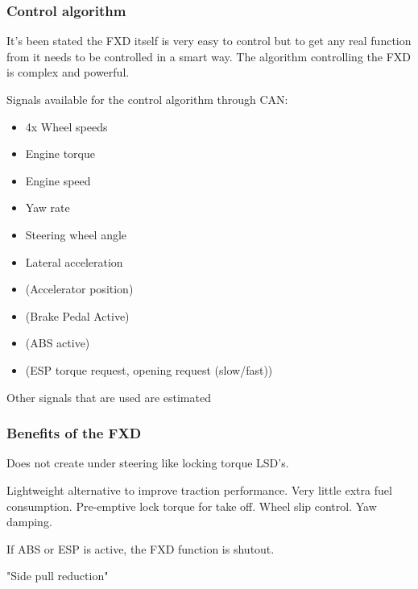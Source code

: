 \subsubsection{Control algorithm}
It's been stated the FXD itself is very easy to control but to get any real function from it needs to be controlled in a smart way. The algorithm controlling the FXD is complex and powerful.

Signals available for the control algorithm through CAN:
\begin{itemize}
	\item 4x Wheel speeds
	\item Engine torque
	\item Engine speed
	\item Yaw rate
	\item Steering wheel angle
	\item Lateral acceleration
	\item (Accelerator position)
	\item (Brake Pedal Active)
	\item (ABS active)
	\item (ESP torque request, opening request (slow/fast))
\end{itemize}

Other signals that are used are estimated

\subsubsection{Benefits of the FXD}

Does not create under steering like locking torque LSD's. 

Lightweight alternative  to improve traction performance. Very little extra fuel consumption. Pre-emptive lock torque for take off. Wheel slip control. Yaw damping. 

If ABS or ESP is active, the FXD function is shutout. 

"Side pull reduction"
